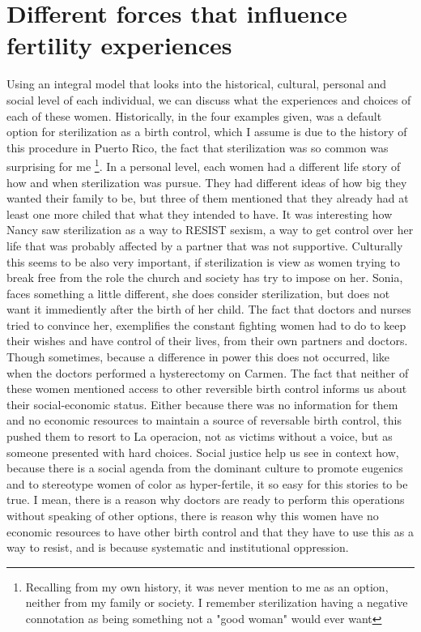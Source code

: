 \documentclass{tufte-handout}
\begin{document}
\section{Different forces that influence fertility experiences}\label{sec:page-layout}
Using an integral model that looks into the historical, cultural, personal and social level of each individual, we can discuss what the experiences and choices of each of these women. Historically, in the four examples given, was a default option for sterilization as a birth control, which I assume is due to the history of this procedure in Puerto Rico, the fact that sterilization was so common was surprising for me \footnote{Recalling from my own history, it was never mention to me as an option, neither from my family or society. I remember sterilization having a negative connotation as being something not a "good woman" would ever want}. In a personal level, each women had a different life story of how and when sterilization was pursue. They had different ideas of how big they wanted their family to be, but three of them mentioned that they already had at least one more chiled that what they intended to have. It was interesting how Nancy saw sterilization as a way to RESIST sexism, a way to get control over her life that was probably affected by a partner that was not supportive.  Culturally this seems to be also very important, if sterilization is view as women trying to break free from the role the church and society has try to impose on her. Sonia, faces something a little different, she does consider sterilization, but does not want it immediently after the birth of her child. The fact that doctors and nurses tried to convince her, exemplifies the constant fighting women had to do to keep their wishes and have control of their lives, from their own partners and doctors. Though sometimes, because a difference in power this does not occurred, like when the doctors performed a hysterectomy on Carmen. The fact that neither of these women mentioned access to other reversible birth control informs us about their social-economic status. Either because there was no information for them and no economic resources to maintain a source of reversable birth control, this pushed them to resort to La operacion, not as victims without a voice, but as someone presented with hard choices. Social justice help us see in context how, because there is a social agenda from the dominant culture to promote eugenics and to stereotype women of color as hyper-fertile, it so easy for this stories to be true. I mean, there is a reason why doctors are ready to perform this operations without speaking of other options, there is reason why this women have no economic resources to have other birth control and that they have to use this as a way to resist, and is because systematic and institutional oppression. 
\end{document}

